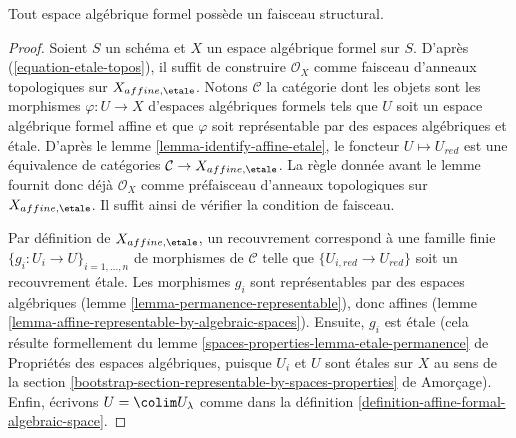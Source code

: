 \begin{lemma}
\label{lemma-structure-sheaf}
Tout espace algébrique formel possède un faisceau structural.
\end{lemma}

\begin{proof}
Soient $S$ un schéma et $X$ un espace algébrique formel sur $S$.
D'après (\ref{equation-etale-topos}), il suffit de construire $\mathcal{O}_X$
comme faisceau d'anneaux topologiques sur $X_{affine, \etale}$.
Notons $\mathcal{C}$ la catégorie dont les objets
sont les morphismes $\varphi : U \to X$ d'espaces algébriques formels tels que
$U$ soit un espace algébrique formel affine et que
$\varphi$ soit représentable par des espaces algébriques et \'etale.
D'après le lemme \ref{lemma-identify-affine-etale},
le foncteur $U \mapsto U_{red}$ est une équivalence de catégories
$\mathcal{C} \to X_{affine, \etale}$. La règle donnée
avant le lemme fournit donc déjà $\mathcal{O}_X$ comme préfaisceau
d'anneaux topologiques sur $X_{affine, \etale}$. Il suffit ainsi de vérifier
la condition de faisceau.

\medskip\noindent
Par définition de $X_{affine, \etale}$, un recouvrement correspond à une famille finie
$\{g_i : U_i \to U\}_{i = 1, \ldots, n}$ de morphismes de $\mathcal{C}$
telle que $\{U_{i, red} \to U_{red}\}$ soit un recouvrement \'etale.
Les morphismes $g_i$ sont représentables par des espaces algébriques
(lemme \ref{lemma-permanence-representable}), donc affines
(lemme \ref{lemma-affine-representable-by-algebraic-spaces}).
Ensuite, $g_i$ est \'etale (cela résulte formellement du
lemme \ref{spaces-properties-lemma-etale-permanence} de Propriétés des espaces algébriques,
puisque $U_i$ et $U$ sont \'etales sur $X$ au sens de la
section \ref{bootstrap-section-representable-by-spaces-properties} de Amorçage).
Enfin, écrivons $U = \colim U_\lambda$ comme dans la
définition \ref{definition-affine-formal-algebraic-space}.


\end{proof}
